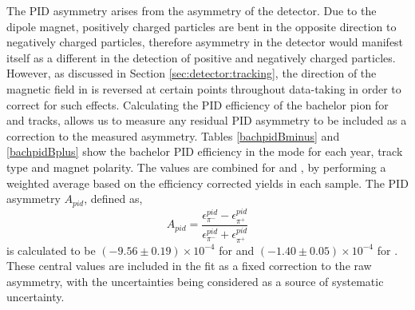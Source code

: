 The PID asymmetry arises from the asymmetry of the detector. Due to the \lhcb dipole magnet, positively charged particles are bent in the opposite direction to negatively charged particles, therefore asymmetry in the detector would manifest itself as a different in the detection of positive and negatively charged particles. However, as discussed in Section \ref{sec:detector:tracking}, the direction of the magnetic field in \lhcb is reversed at certain points throughout data-taking in order to correct for such effects. Calculating the PID efficiency of the bachelor pion for \Bp and \Bm tracks, allows us to measure any residual PID asymmetry to be included as a correction to the measured asymmetry. Tables \ref{bachpidBminus} and \ref{bachpidBplus} show the bachelor PID efficiency in the \kpi mode for each year, \KS track type and magnet polarity. The values are combined for \runone and \runtwo, by performing a weighted average based on the efficiency corrected yields in each sample. The PID asymmetry $A_{pid}$, defined as,
\begin{equation*}
A_{pid} = \frac{\epsilon_{\pi^-}^{pid} - \epsilon_{\pi^+}^{pid}}{\epsilon_{\pi^-}^{pid} + \epsilon_{\pi^+}^{pid}}
\end{equation*}
is calculated to be $(-9.56 \pm 0.19) \times 10^{-4}$ for \runone and $(-1.40 \pm 0.05) \times 10^{-4}$ for \runtwo. These central values are included in the \CP fit as a fixed correction to the raw asymmetry, with the uncertainties being considered as a source of systematic uncertainty.

